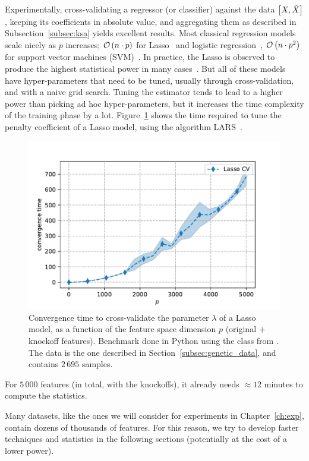 Experimentally, cross-validating a regressor (or classifier) against the data $\big[ X, \tilde{X} \big]$,
keeping its coefficients in absolute value,
and aggregating them as described in Subsection~\ref{subsec:ksa} yields excellent results.
Most classical regression models scale nicely as $p$ increases;
$\mathcal{O}\left( n \cdot p \right)$ for Lasso~\citep{lasso} and logistic regression~\citep{logistic_regression},
$\mathcal{O}\left( n \cdot p^2 \right)$ for support vector machines (SVM)~\citep{svm}.
In practice, the Lasso is observed to produce the highest statistical power in many cases~\citep{model_x_knockoffs}.
But all of these models have hyper-parameters that need to be tuned,
usually through cross-validation,
and with a naive grid search.
Tuning the estimator tends to lead to a higher power than picking ad hoc hyper-parameters,
but it increases the time complexity of the training phase by a lot.
Figure~\ref{fig:lasso_times} shows the time required to tune the penalty coefficient of a Lasso model,
using the algorithm LARS~\citep{lars}.
\begin{figure}
    \centering
    \includegraphics[width=0.8\linewidth, height=0.5\linewidth]{figures/lasso_cv_times.pdf}
    \caption{
        Convergence time to cross-validate the parameter $\lambda$ of a Lasso model,
        as a function of the feature space dimension $p$ (original + knockoff features).
        Benchmark done in Python using the class  from .
        The data is the one described in Section~\ref{subsec:genetic_data},
        and contains $2\,695$ samples.
    }
    \label{fig:lasso_times}
\end{figure}
For $5\,000$ features (in total, with the knockoffs),
it already needs $\approx 12$ minutes to compute the statistics.

Many datasets, like the ones we will consider for experiments in Chapter~\ref{ch:exp},
contain dozens of thousands of features.
For this reason, we try to develop faster techniques and statistics in the following sections
(potentially at the cost of a lower power).


